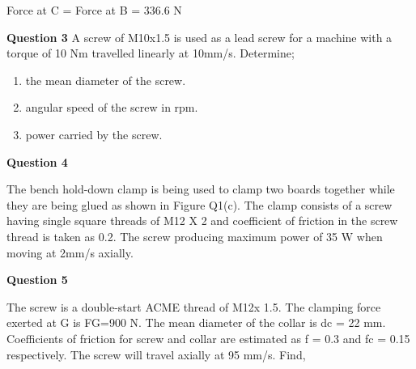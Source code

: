 \documentclass[a4paper, fleqn]{article}
\begin{document}
Force at C = Force at B = 336.6 N

\newpage
\textbf{Question 3}
A screw of M10x1.5 is used as a lead screw for a machine with a torque of 10 Nm travelled linearly at 10mm/s. Determine;
\begin{enumerate}[label=(\roman*)]
    \item the mean diameter of the screw.
    \item angular speed of the screw in rpm.
    \item power carried by the screw.
\end{enumerate}

\newpage
\textbf{Question 4}

The bench hold-down clamp is being used to clamp two boards together while they are being glued as shown in Figure Q1(c). The clamp consists of a screw having single square threads of M12 X 2 and coefficient of friction in the screw thread is taken as 0.2. The screw producing maximum power of 35 W when moving at 2mm/s axially.

\newpage
\textbf{Question 5}

The screw is a double-start ACME thread of M12x 1.5. The clamping force exerted at G is FG=900 N. The mean diameter of the collar is dc = 22 mm. Coefficients of friction for screw and collar are estimated as f = 0.3 and fc = 0.15 respectively. The screw will travel axially at 95 mm/s. Find,
\end{document}
